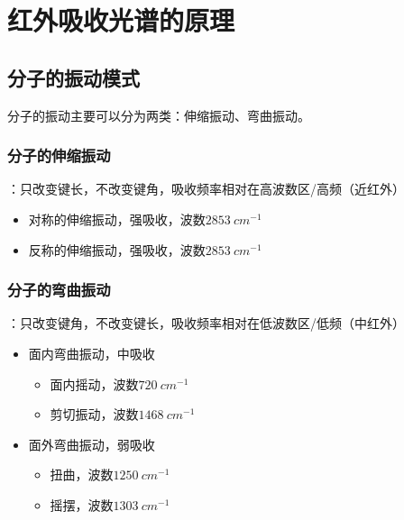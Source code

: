 \section{红外吸收光谱的原理}

\subsection{分子的振动模式}
分子的振动主要可以分为两类：伸缩振动、弯曲振动。

\subsubsection{分子的伸缩振动}
：只改变键长，不改变键角，吸收频率相对在高波数区/高频（近红外）
\begin{itemize}
    \item 对称的伸缩振动，强吸收，波数$\SI{2853}{cm^{-1}}$
    \item 反称的伸缩振动，强吸收，波数$\SI{2853}{cm^{-1}}$
\end{itemize}

\subsubsection{分子的弯曲振动}
：只改变键角，不改变键长，吸收频率相对在低波数区/低频（中红外）
\begin{itemize}
    \item 面内弯曲振动，中吸收
    \begin{itemize}
        \item 面内摇动，波数$\SI{720}{cm^{-1}}$
        \item 剪切振动，波数$\SI{1468}{cm^{-1}}$
    \end{itemize}
    \item 面外弯曲振动，弱吸收
    \begin{itemize}
        \item 扭曲，波数$\SI{1250}{cm^{-1}}$
        \item 摇摆，波数$\SI{1303}{cm^{-1}}$
    \end{itemize}
\end{itemize}

